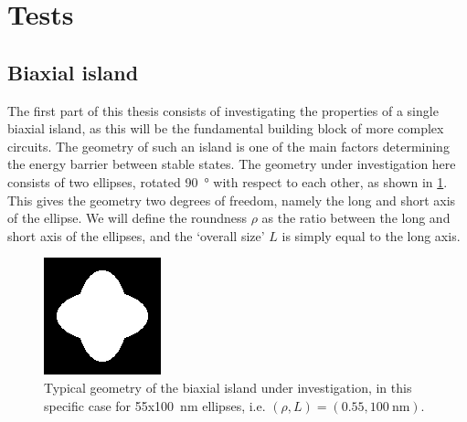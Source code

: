 \documentclass[10pt,a4paper]{article}
\begin{document}
\section{Tests}
\subsection{Biaxial island}
The first part of this thesis consists of investigating the properties of a single biaxial island, as this will be the fundamental building block of more complex circuits. The geometry of such an island is one of the main factors determining the energy barrier between stable states. The geometry under investigation here consists of two ellipses, rotated \SI{90}{\degree} with respect to each other, as shown in \cref{fig:biaxial_island:geometryTypical}. This gives the geometry two degrees of freedom, namely the long and short axis of the ellipse. We will define the roundness $\rho$ as the ratio between the long and short axis of the ellipses, and the `overall size' $L$ is simply equal to the long axis.
\begin{figure}
    \centering
    \includegraphics[width=0.3\columnwidth]{Figures/biaxial_island/Geometry/geomPlus55.png}
    \caption{Typical geometry of the biaxial island under investigation, in this specific case for 55x\SI{100}{\nano\metre} ellipses, i.e. $(\rho, L)=(0.55, \SI{100}{\nano\metre})$.}
    \label{fig:biaxial_island:geometryTypical}
\end{figure}
\end{document}
